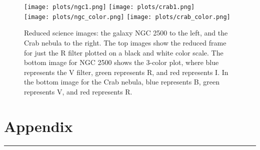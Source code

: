 \documentclass[preprint]{aastex62}
\begin{document}
\begin{figure}[H]
\begin{center}
\texttt{[image: plots/ngc1.png]}
\texttt{[image: plots/crab1.png]} \\
\texttt{[image: plots/ngc\_color.png]}
\texttt{[image: plots/crab\_color.png]}
\caption{Reduced science images: the galaxy NGC 2500 to the left, and the Crab nebula to the right. The top images show the reduced frame for just the R filter plotted on a black and white color scale. The bottom image for NGC 2500 shows the 3-color plot, where blue represents the V filter, green represents R, and red represents I. In the bottom image for the Crab nebula, blue represents B, green represents V, and red represents R.} \label{fig:sci_imgs}
\end{center} 
\end{figure}



\newpage
\section{Appendix}


\vspace{7pt} \hrule \vspace{7pt}
\end{document}
